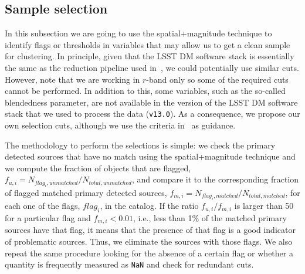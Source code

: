 \documentclass[twocolumn]{aastex62}
\begin{document}
\subsection{Sample selection}
\label{ssec:sample_selection}

In this subsection we are going to use the spatial+magnitude technique to identify flags or thresholds in variables that may allow us to get a clean sample for clustering. In principle, given that the LSST DM software stack is essentially the same as the reduction pipeline used in~\citet{2018PASJ...70S..25M}, we could potentially use similar cuts. However, note that we are working in $r$-band only so some of the required cuts cannot be performed. In addition to this, some variables, such as the so-called blendedness parameter, are not available in the version of the LSST DM software stack that we used to process the data (\texttt{v13.0}). As a consequence, we propose our own selection cuts, although we use the criteria in~\citet{2018PASJ...70S..25M} as guidance.

The methodology to perform the selections is simple: we check the primary detected sources that have no match using the spatial+magnitude technique and we compute the fraction of objects that are flagged, $f_{u,i} = N_{flag_{i}, unmatched}/N_{total, unmatched}$, and compare it to the corresponding fraction of flagged matched primary detected sources, $f_{m,i} = N_{flag_{i}, matched}/N_{total, matched}$, for each one of the flags, $flag_{i}$, in the catalog. If the ratio $f_{u,i}/f_{m,i}$ is larger than 50 for a particular flag and $f_{m,i} < 0.01$, i.e., less than 1\% of the matched primary sources have that flag, it means that the presence of that flag is a good indicator of problematic sources. Thus, we eliminate the sources with those flags. We also repeat the same procedure looking for the absence of a certain flag or whether a quantity is frequently measured as \texttt{NaN} and check for redundant cuts.
\end{document}
